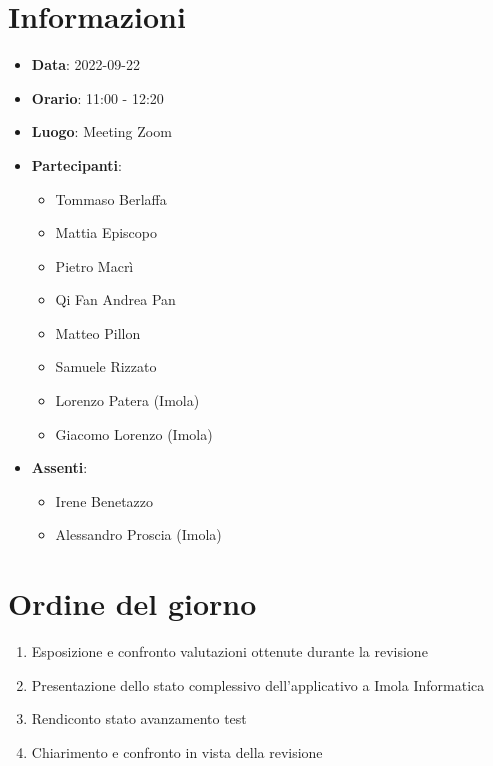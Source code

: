 \section{Informazioni}
	\begin{itemize}
		\item \textbf{Data}: 2022-09-22     %
		\item \textbf{Orario}: 11:00 - 12:20     %
		\item \textbf{Luogo}: Meeting Zoom
		\item \textbf{Partecipanti}:
		\begin{itemize}
			\item Tommaso Berlaffa
			\item Mattia Episcopo
			\item Pietro Macrì
			\item Qi Fan Andrea Pan
			\item Matteo Pillon
			\item Samuele Rizzato
			\item Lorenzo Patera (Imola)
			\item Giacomo Lorenzo (Imola)
		\end{itemize}
        \item \textbf{Assenti}: 
			\begin{itemize}
				\item Irene Benetazzo
	 			\item Alessandro Proscia (Imola)
			\end{itemize}
	\end{itemize}
    
	\section{Ordine del giorno}
	\begin{enumerate}
		\item Esposizione e confronto valutazioni ottenute durante la revisione 
		\item Presentazione dello stato complessivo     dell'applicativo a Imola Informatica
		\item Rendiconto stato avanzamento test
		\item Chiarimento e confronto in vista della revisione  
	\end{enumerate}
	\newpage